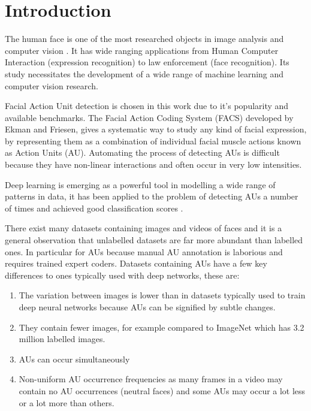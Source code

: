 \chapter{Introduction} \label{chap:intro}

  The human face is one of the most researched objects in image analysis
  and computer vision \cite{S.ZafeiriouA.PapaioannouI.KotsiaM.A.Nicolaou}.
  It has wide ranging applications from Human
  Computer Interaction (expression recognition) to law enforcement (face recognition).
  Its study necessitates the development of a wide range of machine
  learning and computer vision research.

  Facial Action Unit detection \cite{Corneanu2016} is chosen in this work due
  to it's popularity and available benchmarks.
  The Facial Action Coding System (FACS) developed by Ekman and Friesen,
  gives a systematic way to study any kind of facial expression,
  by representing them as a combination of individual facial muscle actions
  known as Action Units (AU). Automating the process of detecting AUs is difficult
  because they have non-linear interactions \cite{S.EleftheriadisO.Rudovic}
  and often occur in very low intensities.

  Deep learning is emerging as a powerful tool in modelling a wide range of patterns
  in data, it has been applied to the problem of detecting AUs a number of times and achieved
  good classification scores \cite{Khorrami2015,Jaiswal2016,Kim2016,Gudi2015,Ghosh2015}.

  There exist many datasets containing images and videos of faces and it is a general
  observation that unlabelled datasets are far more abundant than labelled ones.
  In particular for AUs because manual AU
  annotation is laborious and requires trained expert coders.
  Datasets containing AUs have a few key differences to ones typically used with
  deep networks, these are:
  \begin{enumerate}
    \item The variation between images is lower than in datasets typically used
          to train deep neural networks because AUs can be signified by subtle changes.
    \item They contain fewer images, for example compared to ImageNet\cite{Deng2009} which has 3.2 million labelled images.
    \item AUs can occur simultaneously
    \item Non-uniform AU occurrence frequencies as many frames in a video may
    contain no AU occurrences (neutral faces) and some AUs may occur a lot less or a lot more than others.
  \end{enumerate}

